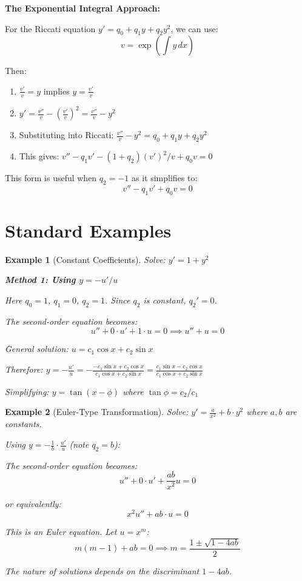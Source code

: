 \documentclass[12pt]{article}
\newtheorem{example}{Example}
\begin{document}
\begin{transformation}
\textbf{The Exponential Integral Approach:}

For the Riccati equation $y' = q_0 + q_1 y + q_2 y^2$, we can use:
$$v = \exp\left(\int y \, dx\right)$$

Then:
\begin{enumerate}
    \item $\frac{v'}{v} = y$ implies $y = \frac{v'}{v}$
    \item $y' = \frac{v''}{v} - \left(\frac{v'}{v}\right)^2 = \frac{v''}{v} - y^2$
    \item Substituting into Riccati: $\frac{v''}{v} - y^2 = q_0 + q_1 y + q_2 y^2$
    \item This gives: $v'' - q_1 v' - (1 + q_2)(v')^2/v + q_0 v = 0$
\end{enumerate}

This form is useful when $q_2 = -1$ as it simplifies to:
$$v'' - q_1 v' + q_0 v = 0$$
\end{transformation}

\section{Standard Examples}

\begin{example}[Constant Coefficients]
Solve: $y' = 1 + y^2$

\textbf{Method 1: Using $y = -u'/u$}

Here $q_0 = 1$, $q_1 = 0$, $q_2 = 1$. Since $q_2$ is constant, $q_2' = 0$.

The second-order equation becomes:
$$u'' + 0 \cdot u' + 1 \cdot u = 0 \implies u'' + u = 0$$

General solution: $u = c_1 \cos x + c_2 \sin x$

Therefore: $y = -\frac{u'}{u} = -\frac{-c_1 \sin x + c_2 \cos x}{c_1 \cos x + c_2 \sin x} = \frac{c_1 \sin x - c_2 \cos x}{c_1 \cos x + c_2 \sin x}$

Simplifying: $y = \tan(x - \phi)$ where $\tan \phi = c_2/c_1$
\end{example}

\begin{example}[Euler-Type Transformation]
Solve: $y' = \frac{a}{x^2} + b \cdot y^2$ where $a, b$ are constants.

Using $y = -\frac{1}{b} \cdot \frac{u'}{u}$ (note $q_2 = b$):

The second-order equation becomes:
$$u'' + 0 \cdot u' + \frac{ab}{x^2} u = 0$$

or equivalently:
$$x^2 u'' + ab \cdot u = 0$$

This is an Euler equation. Let $u = x^m$:
$$m(m-1) + ab = 0 \implies m = \frac{1 \pm \sqrt{1 - 4ab}}{2}$$

The nature of solutions depends on the discriminant $1 - 4ab$.
\end{example}
\end{document}
